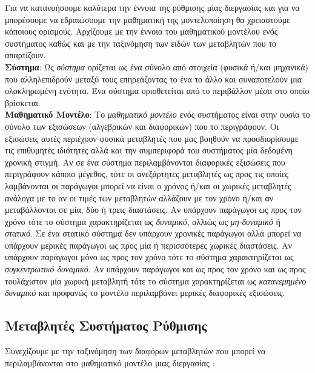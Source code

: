 \documentclass[11pt]{article} %
\numberwithin{equation}{subsection}
\begin{document}
 Για να κατανοήσουμε καλύτερα την έννοια της ρύθμισης μίας διεργασίας και για να μπορέσουμε να εδραιώσουμε την μαθηματική της μοντελοποίηση θα χρειαστούμε κάποιους ορισμούς. Αρχίζουμε με την έννοια του μαθηματικού μοντέλου ενός συστήματος καθώς και με την ταξινόμηση των ειδών των μεταβλητών που το απαρτίζουν. \\

\textbf{Σύστημα}: Ως \textit{σύστημα} ορίζεται ως ένα σύνολο από στοιχεία (φυσικά ή/και μηχανικά) που αλληλεπιδρούν μεταξύ τους επηρεάζοντας το ένα το άλλο και συναποτελούν μια ολοκληρωμένη ενότητα. Ένα σύστημα οριοθετείται από το περιβάλλον μέσα στο οποίο βρίσκεται.\\

\textbf{Μαθηματικό Μοντέλο}: Το \textit{μαθηματικό μοντέλο} ενός συστήματος είναι στην ουσία το σύνολο των εξισώσεων (αλγεβρικών και διαφορικών) που το περιγράφουν. Οι εξισώσεις αυτές περιέχουν φυσικά μεταβλητές που μας βοηθούν να προσδιορίσουμε τις επιθυμητές ιδιότητες αλλά και την συμπεριφορά του συστήματος μία δεδομένη χρονική στιγμή. Αν σε ένα σύστημα περιλαμβάνονται διαφορικές εξισώσεις που περιγράφουν κάποιο μέγεθος, τότε οι ανεξάρτητες μεταβλητές ως προς τις οποίες λαμβάνονται οι παράγωγοι μπορεί να είναι ο χρόνος ή/και οι χωρικές μεταβλητές ανάλογα με το αν οι τιμές των μεταβλητών αλλάζουν με τον χρόνο ή/και αν μεταβάλλονται σε μία, δύο ή τρεις διαστάσεις. Αν υπάρχουν παράγωγοι ως προς τον χρόνο τότε το σύστημα χαρακτηρίζεται ως \textit{δυναμικό}, αλλιώς ως \textit{μη-δυναμικό} ή \textit{στατικό}. Σε ένα στατικό σύστημα δεν υπάρχουν χρονικές παράγωγοι αλλά μπορεί να υπάρχουν μερικές παράγωγοι ως προς μία ή περισσότερες χωρικές διαστάσεις. Αν υπάρχουν παράγωγοι μόνο ως προς τον χρόνο τότε το σύστημα χαρακτηρίζεται ως \textit{συγκεντρωτικό δυναμικό}. Αν υπάρχουν παράγωγοι και ως προς τον χρόνο και ως προς τουλάχιστον μία χωρική μεταβλητή τότε το σύστημα χαρακτηρίζεται ως \textit{κατανεμημένο δυναμικό} και προφανώς το μοντέλο περιλαμβάνει μερικές διαφορικές εξισώσεις.  \\


\subsection{Μεταβλητές Συστήματος Ρύθμισης}
Συνεχίζουμε με την ταξινόμηση των διαφόρων μεταβλητών που μπορεί να περιλαμβάνονται στο μαθηματικό μοντέλο μιας διεργασίας \cite{daoutidhs}: \\
\end{document}
